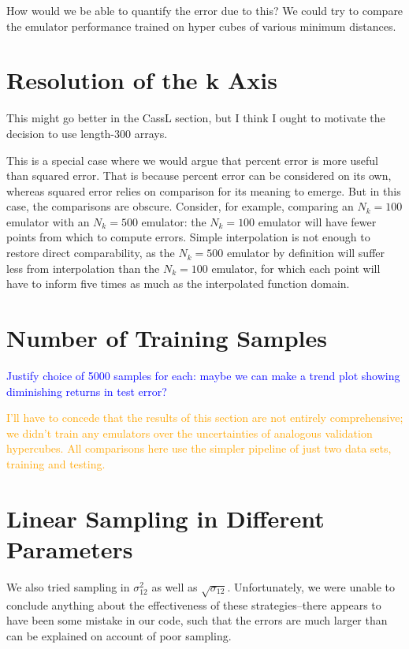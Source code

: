 How would we
be able to quantify the error due to this? We could try to compare the
emulator performance trained on hyper cubes of various minimum distances.

\section{Resolution of the k Axis}

This might go better in the CassL section, but I think I ought to motivate the 
decision to use length-300 arrays.

This is a special case where we would argue that percent error is more useful 
than squared error.
That is because percent error can be considered on its own, whereas squared
error relies on comparison for its meaning to emerge. But in this case, the
comparisons are obscure. Consider, for example, comparing an $N_k = 100$
emulator with an $N_k = 500$ emulator: the $N_k = 100$ emulator will have
fewer points from which to compute errors. Simple interpolation is not enough
to restore direct comparability, as the $N_k = 500$ emulator by definition
will suffer less from interpolation than the $N_k = 100$ emulator, for which
each point will have to inform five times as much as the interpolated function
domain.

\section{Number of Training Samples}
\label{sec: num_samples}

\textcolor{blue}{Justify choice of 5000 samples for each: maybe we can make a
trend plot showing diminishing returns in test error?}


\textcolor{orange}{I'll have to concede that the results of this section are 
not entirely comprehensive; we didn't train any emulators over the 
uncertainties of analogous validation hypercubes. All comparisons here use the 
simpler pipeline of just two data sets, training and testing.}


\section{Linear Sampling in Different Parameters}

We also tried sampling in $\sigma_{12}^2$ as well as $\sqrt{\sigma_{12}}$.
Unfortunately, we were unable to conclude anything about the effectiveness of
these strategies--there appears to have been some mistake in our code, such
that the errors are much larger than can be explained on account of poor
sampling.

